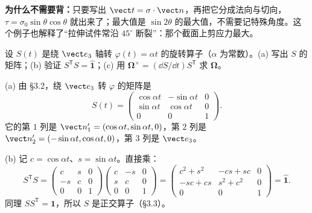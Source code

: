 \documentclass[11pt]{ctexart}
\newcommand{\ten}[1]{\mathbf{#1}}
\newcommand{\unitd}{\hat{\ten{1}}}
\begin{document}
\textbf{为什么不需要背：}只要写出 $\vect t=\ten\sigma\cdot\vect n$，再把它分成法向与切向，$\tau=\sigma_0\sin\theta\cos\theta$ 就出来了；最大值是 $\sin2\theta$ 的最大值，不需要记特殊角度。这个例子也解释了“拉伸试件常沿 $45^\circ$ 断裂”：那个截面上剪应力最大。

{设 $S(t)$ 是绕 $\vect e_3$ 轴转 $\varphi(t)=\alpha t$ 的旋转算子（$\alpha$ 为常数）。(a) 写出 $S$ 的矩阵；(b) 验证 $S^{\mathsf T}S=\unitd$；(c) 用 $\boldsymbol\Omega^{\times}=(\dd S/\dd t)S^{\mathsf T}$ 求 $\boldsymbol\Omega$。}

(a) 由 §3.2，绕 $\vect e_3$ 转 $\varphi$ 的矩阵是
\[
S(t)=
\begin{pmatrix}
\cos\alpha t&-\sin\alpha t&0\\
\sin\alpha t&\cos\alpha t&0\\
0&0&1
\end{pmatrix}.
\]
它的第 $1$ 列是 $\vect n'_1=(\cos\alpha t,\sin\alpha t,0)$，第 $2$ 列是 $\vect n'_2=(-\sin\alpha t,\cos\alpha t,0)$，第 $3$ 列是 $\vect e_3$。

(b) 记 $c=\cos\alpha t$、$s=\sin\alpha t$。直接乘：
\[
S^{\mathsf T}S=
\begin{pmatrix}
c&s&0\\-s&c&0\\0&0&1
\end{pmatrix}
\begin{pmatrix}
c&-s&0\\s&c&0\\0&0&1
\end{pmatrix}
=
\begin{pmatrix}
c^2+s^2&-cs+sc&0\\
-sc+cs&s^2+c^2&0\\
0&0&1
\end{pmatrix}
=\unitd .
\]
同理 $SS^{\mathsf T}=\unitd$，所以 $S$ 是正交算子（§3.3）。
\end{document}

